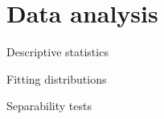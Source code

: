 \documentclass[journal]{IEEEtran}
\begin{document}



\section{Data analysis}

Descriptive statistics

Fitting distributions

Separability tests
\end{document}
